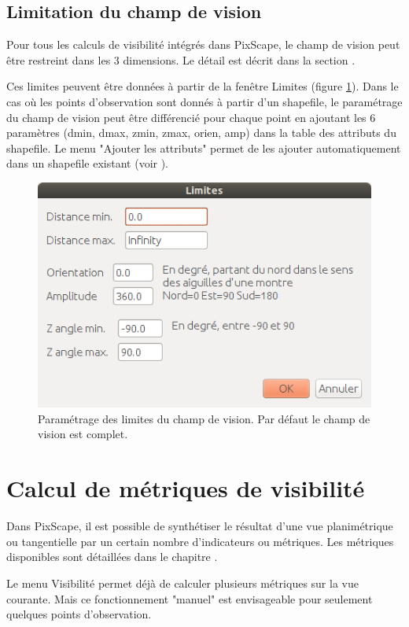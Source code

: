 \documentclass{report}
\begin{document}
\subsection{Limitation du champ de vision}
\label{bounds_ui}
Pour tous les calculs de visibilité intégrés dans PixScape, le champ de vision peut être restreint dans les 3 dimensions. Le détail est décrit dans la section .

Ces limites peuvent être données à partir de la fenêtre Limites (figure \ref{bounds_dlg}). Dans le cas où les points d'observation sont donnés à partir d'un shapefile, le paramétrage du champ de vision peut être différencié pour chaque point en ajoutant les 6 paramètres (dmin, dmax, zmin, zmax, orien, amp) dans la table des attributs du shapefile. Le menu "Ajouter les attributs" permet de les ajouter automatiquement dans un shapefile existant (voir ).

\begin{figure}[H]
	\includegraphics[scale=0.5]{img/bounds-fr.png} 
	\caption{Paramétrage des limites du champ de vision. Par défaut le champ de vision est complet.}
	\label{bounds_dlg}
\end{figure}

\section{Calcul de métriques de visibilité}
\label{calc_metrics}
Dans PixScape, il est possible de synthétiser le résultat d'une vue planimétrique ou tangentielle par un certain nombre d'indicateurs ou métriques. Les métriques disponibles sont détaillées dans le chapitre . 

Le menu Visibilité permet déjà de calculer plusieurs métriques sur la vue courante. Mais ce fonctionnement "manuel" est envisageable pour seulement quelques points d'observation. 
\end{document}

